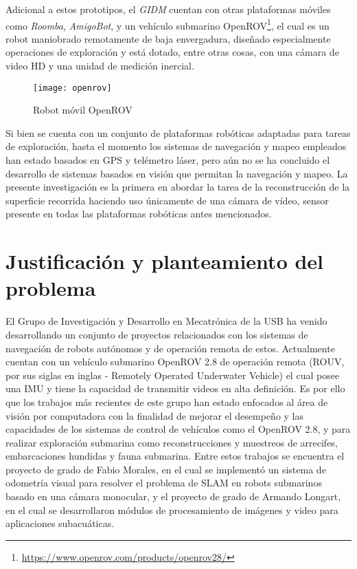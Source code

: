 Adicional a estos prototipos,  el \textit{GIDM} cuentan con otras plataformas móviles como \textit{Roomba}, \textit{AmigoBot}, y un vehículo submarino OpenROV\footnote{ \url{https://www.openrov.com/products/openrov28/}}, el cual es un robot maniobrado remotamente de baja envergadura, diseñado especialmente operaciones de exploración y está dotado, entre otras cosas, con una cámara de video HD y una unidad de medición inercial.

\begin{figure}[H]
	\centering
	\texttt{[image: openrov]}
	\caption{Robot móvil OpenROV}
	\label{imagen:openrov}
\end{figure}

Si bien se cuenta con un conjunto de plataformas robóticas adaptadas para tareas de exploración, hasta el momento los sistemas de navegación y mapeo empleados han estado basados en GPS y telémetro láser, pero aún no se ha concluido el desarrollo de sistemas basados en visión que permitan la navegación y mapeo. La presente investigación es la primera en abordar la tarea de la reconstrucción de la superficie recorrida haciendo uso únicamente de una cámara de vídeo, sensor presente en todas las plataformas robóticas antes mencionados.

\section{Justificación y planteamiento del problema}

El Grupo de Investigación y Desarrollo en Mecatrónica de la USB ha venido desarrollando un conjunto de proyectos relacionados con los sistemas de navegación de robots autónomos y de operación remota de estos. Actualmente cuentan con un vehículo submarino OpenROV 2.8 de operación remota (ROUV, por sus siglas en inglas - Remotely Operated Underwater Vehicle) el cual posee una IMU y tiene la capacidad de transmitir videos en alta definición. Es por ello que los trabajos más recientes de este grupo han estado enfocados al área de visión por computadora con la finalidad de mejorar el desempeño y las capacidades de los sistemas de control de vehículos como el OpenROV 2.8, y para realizar exploración submarina como reconstrucciones y muestreos de arrecifes, embarcaciones hundidas y fauna submarina. Entre estos trabajos se encuentra el proyecto de grado de Fabio Morales, en el cual se implementó un sistema de odometría visual para resolver el problema de SLAM en robots submarinos basado en una cámara monocular, y el proyecto de grado de  Armando Longart, en el cual se desarrollaron módulos de procesamiento de imágenes y video para aplicaciones subacuáticas.

